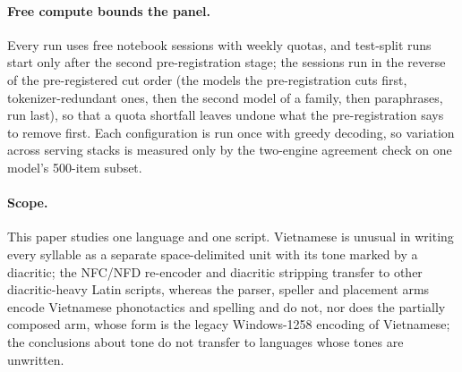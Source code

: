 \paragraph{Free compute bounds the panel.}
Every run uses free notebook sessions with weekly quotas, and test-split runs start only after the second pre-registration stage; the sessions run in the reverse of the pre-registered cut order (the models the pre-registration cuts first, tokenizer-redundant ones, then the second model of a family, then paraphrases, run last), so that a quota shortfall leaves undone what the pre-registration says to remove first.  Each configuration is run once with greedy decoding, so variation across serving stacks is measured only by the two-engine agreement check on one model's 500-item subset.

\paragraph{Scope.}
This paper studies one language and one script. Vietnamese is unusual in writing every syllable as a separate space-delimited unit with its tone marked by a diacritic; the NFC/NFD re-encoder and diacritic stripping transfer to other diacritic-heavy Latin scripts, whereas the parser, speller and placement arms encode Vietnamese phonotactics and spelling and do not, nor does the partially composed arm, whose form is the legacy Windows-1258 encoding of Vietnamese; the conclusions about tone do not transfer to languages whose tones are unwritten.

